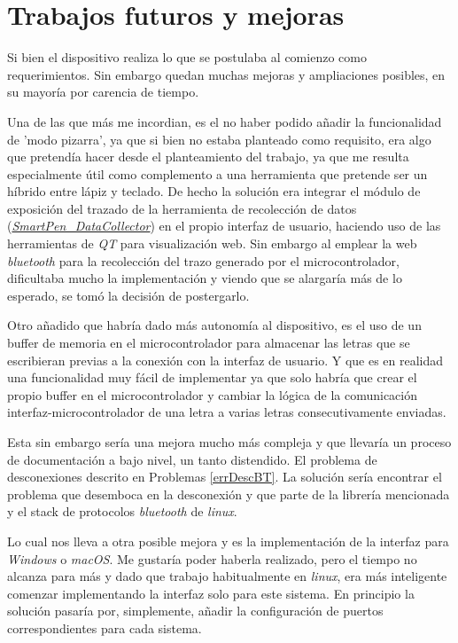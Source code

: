\chapter{Trabajos futuros y mejoras}
Si bien el dispositivo realiza lo que se postulaba al comienzo
como requerimientos. Sin embargo quedan muchas mejoras y ampliaciones
posibles, en su mayoría por carencia de tiempo.

Una de las que más me incordian, es el no haber podido añadir
la funcionalidad de 'modo pizarra', ya que si bien no estaba planteado
como requisito, era algo que pretendía hacer desde el planteamiento del
trabajo, ya que me resulta especialmente útil como complemento a una
herramienta que pretende ser un híbrido entre lápiz y teclado.
De hecho la solución era integrar el módulo de exposición del trazado
de la herramienta de recolección de datos
(\href{https://github.com/AntonioPriego/SmartPen/blob/main/DataCollector/SmartPen_DataCollector.html}{\textit{SmartPen\_DataCollector}})
en el propio interfaz de usuario, haciendo uso de las herramientas de \textit{QT}
para visualización web. Sin embargo al emplear la web \textit{bluetooth}
para la recolección del trazo generado por el microcontrolador, dificultaba
mucho la implementación y viendo que se alargaría más de lo esperado,
se tomó la decisión de postergarlo.

Otro añadido que habría dado más autonomía al dispositivo, es el uso
de un buffer de memoria en el microcontrolador para almacenar
las letras que se escribieran previas a la conexión con la interfaz
de usuario. Y que es en realidad una funcionalidad muy fácil de implementar
ya que solo habría que crear el propio buffer en el microcontrolador
y cambiar la lógica de la comunicación interfaz-microcontrolador de una
letra a varias letras consecutivamente enviadas.

Esta sin embargo sería una mejora mucho más compleja y que llevaría
un proceso de documentación a bajo nivel, un tanto distendido.
El problema de desconexiones descrito en Problemas \ref{errDescBT}.
La solución sería encontrar el problema que desemboca en la desconexión
y que parte de la librería mencionada y el stack de protocolos \textit{bluetooth}
de \textit{linux}.

Lo cual nos lleva a otra posible mejora y es la implementación de la interfaz
para \textit{Windows} o \textit{macOS}. Me gustaría poder haberla realizado, pero el tiempo
no alcanza para más y dado que trabajo habitualmente en \textit{linux},
era más inteligente comenzar implementando la interfaz solo para este sistema.
En principio la solución pasaría por, simplemente, añadir la configuración de
puertos correspondientes para cada sistema.

